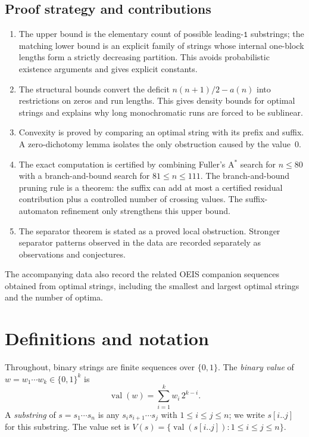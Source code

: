 \documentclass[11pt,a4paper]{article}
\theoremstyle{plain}
\theoremstyle{definition}
\theoremstyle{remark}
\newcommand{\val}{\operatorname{val}}
\begin{document}
\subsection*{Proof strategy and contributions}

\begin{enumerate}[label=(\roman*)]
  \item The upper bound is the elementary count of possible
    leading-$\mathtt{1}$ substrings; the matching lower bound is an
    explicit family of strings whose internal one-block lengths form a
    strictly decreasing partition.  This avoids probabilistic existence
    arguments and gives explicit constants.
  \item The structural bounds convert the deficit
    $n(n+1)/2-a(n)$ into restrictions on zeros and run lengths.  This
    gives density bounds for optimal strings and explains why long
    monochromatic runs are forced to be sublinear.
  \item Convexity is proved by comparing an optimal string with its
    prefix and suffix.  A zero-dichotomy lemma isolates the only
    obstruction caused by the value~$0$.
  \item The exact computation is certified by combining Fuller's A$^*$
    search for $n \le 80$ with a branch-and-bound search for
    $81 \le n \le 111$.  The branch-and-bound pruning rule is a
    theorem: the suffix can add at most a certified residual
    contribution plus a controlled number of crossing values.  The
    suffix-automaton refinement only strengthens this upper bound.
  \item The separator theorem is stated as a proved local obstruction.
    Stronger separator patterns observed in the data are recorded
    separately as observations and conjectures.
\end{enumerate}

The accompanying data also record the related OEIS companion sequences
obtained from optimal strings, including the smallest and largest
optimal strings and the number of optima.

\section{Definitions and notation}\label{sec:definitions}

Throughout, binary strings are finite sequences over $\{0,1\}$.  The
\emph{binary value} of $w = w_1 \cdots w_k \in \{0,1\}^k$ is
\[
  \val(w) = \sum_{i=1}^{k} w_i \, 2^{k-i}.
\]
A \emph{substring} of $s = s_1 \cdots s_n$ is any $s_i s_{i+1} \cdots
s_j$ with $1 \le i \le j \le n$; we write $s[i..j]$ for this
substring.  The value set is
$V(s) = \{\val(s[i..j]) : 1 \le i \le j \le n\}$.
\end{document}

